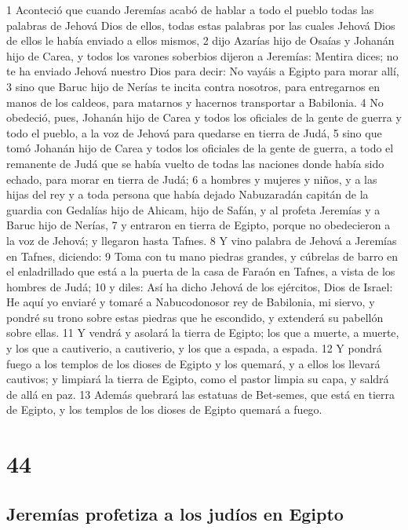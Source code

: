 1 Aconteció que cuando Jeremías acabó de hablar a todo el pueblo todas las palabras de Jehová Dios de ellos, todas estas palabras por las cuales Jehová Dios de ellos le había enviado a ellos mismos,
2 dijo Azarías hijo de Osaías y Johanán hijo de Carea, y todos los varones soberbios dijeron a Jeremías: Mentira dices; no te ha enviado Jehová nuestro Dios para decir: No vayáis a Egipto para morar allí,
3 sino que Baruc hijo de Nerías te incita contra nosotros, para entregarnos en manos de los caldeos, para matarnos y hacernos transportar a Babilonia.
4 No obedeció, pues, Johanán hijo de Carea y todos los oficiales de la gente de guerra y todo el pueblo, a la voz de Jehová para quedarse en tierra de Judá,
5 sino que tomó Johanán hijo de Carea y todos los oficiales de la gente de guerra, a todo el remanente de Judá que se había vuelto de todas las naciones donde había sido echado, para morar en tierra de Judá;
6 a hombres y mujeres y niños, y a las hijas del rey y a toda persona que había dejado Nabuzaradán capitán de la guardia con Gedalías hijo de Ahicam, hijo de Safán, y al profeta Jeremías y a Baruc hijo de Nerías,
7 y entraron en tierra de Egipto, porque no obedecieron a la voz de Jehová; y llegaron hasta Tafnes.
8 Y vino palabra de Jehová a Jeremías en Tafnes, diciendo:
9 Toma con tu mano piedras grandes, y cúbrelas de barro en el enladrillado que está a la puerta de la casa de Faraón en Tafnes, a vista de los hombres de Judá;
10 y diles: Así ha dicho Jehová de los ejércitos, Dios de Israel: He aquí yo enviaré y tomaré a Nabucodonosor rey de Babilonia, mi siervo, y pondré su trono sobre estas piedras que he escondido, y extenderá su pabellón sobre ellas.
11 Y vendrá y asolará la tierra de Egipto; los que a muerte, a muerte, y los que a cautiverio, a cautiverio, y los que a espada, a espada.
12 Y pondrá fuego a los templos de los dioses de Egipto y los quemará, y a ellos los llevará cautivos; y limpiará la tierra de Egipto, como el pastor limpia su capa, y saldrá de allá en paz.
13 Además quebrará las estatuas de Bet-semes, que está en tierra de Egipto, y los templos de los dioses de Egipto quemará a fuego.

\chapter{44}

\section*{Jeremías profetiza a los judíos en Egipto}

